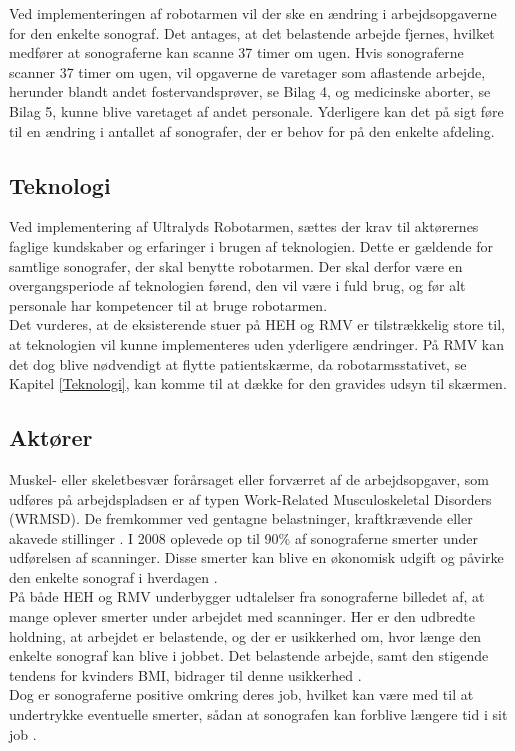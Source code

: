 Ved implementeringen af robotarmen vil der ske en ændring i arbejdsopgaverne for den enkelte sonograf. Det antages, at det belastende arbejde fjernes, hvilket medfører at sonograferne kan scanne 37 timer om ugen. Hvis sonograferne scanner 37 timer om ugen, vil opgaverne de varetager som aflastende arbejde, herunder blandt andet fostervandsprøver, se Bilag 4, og medicinske aborter, se Bilag 5, kunne blive varetaget af andet personale. Yderligere kan det på sigt føre til en ændring i antallet af sonografer, der er behov for på den enkelte afdeling. 

\subsection{Teknologi}
Ved implementering af Ultralyds Robotarmen, sættes der krav til aktørernes faglige kundskaber og erfaringer i brugen af teknologien. Dette er gældende for samtlige sonografer, der skal benytte robotarmen. Der skal derfor være en overgangsperiode af teknologien førend, den vil være i fuld brug, og før alt personale har kompetencer til at bruge robotarmen. \\
Det vurderes, at de eksisterende stuer på HEH og RMV er tilstrækkelig store til, at teknologien vil kunne implementeres uden yderligere ændringer. På RMV kan det dog blive nødvendigt at flytte patientskærme, da robotarmsstativet, se Kapitel \ref{Teknologi}, kan komme til at dække for den gravides udsyn til skærmen.  

\subsection{Aktører} \label{aktoerer_organisation}
Muskel- eller skeletbesvær forårsaget eller forværret af de arbejdsopgaver, som udføres på arbejdspladsen er af typen Work-Related Musculoskeletal Disorders (WRMSD). De fremkommer ved gentagne belastninger, kraftkrævende eller akavede stillinger \cite{24}. I 2008 oplevede op til 90\% af sonograferne smerter under udførelsen af scanninger. Disse smerter kan blive en økonomisk udgift og påvirke den enkelte sonograf i hverdagen \cite{24}\cite{31}\cite{36}\cite{30}.\\
På både HEH og RMV underbygger udtalelser fra sonograferne billedet af, at mange oplever smerter under arbejdet med scanninger. 
Her er den udbredte holdning, at arbejdet er belastende, og der er usikkerhed om, hvor længe den enkelte sonograf kan blive i jobbet. Det belastende arbejde, samt den stigende tendens for kvinders BMI, bidrager til denne usikkerhed \cite{24}\cite{31}\cite{kvinderovervaegt}. \\
Dog er sonograferne positive omkring deres job, hvilket kan være med til at undertrykke eventuelle smerter, sådan at sonografen kan forblive længere tid i sit job \cite{1}\cite{24}.

